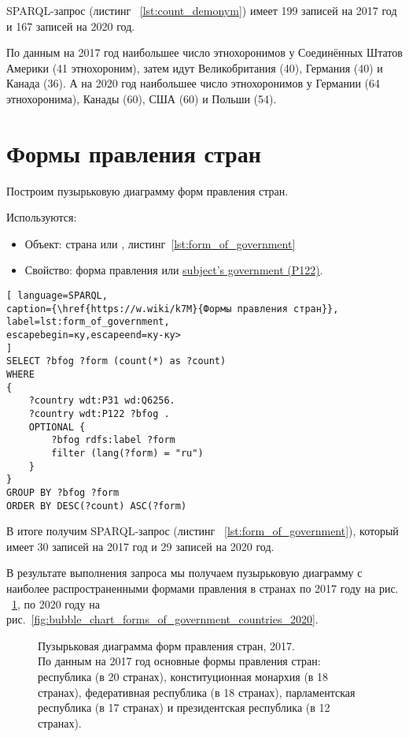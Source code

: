 SPARQL-запрос (листинг ~\ref{lst:count_demonym}) имеет 199 записей на 2017 год и 167 записей на 2020 год.

По данным на 2017 год наибольшее число этнохоронимов у Соединённых Штатов Америки (41 этнохороним), затем идут Великобритания (40), Германия (40) и Канада (36). А на 2020 год наибольшее число этнохоронимов у Германии (64 этнохоронима), Канады (60), США (60) и Польши (54).
\section{Формы правления стран}

Построим пузырьковую диаграмму форм правления стран.

Используются:
\begin{itemize}
	\item Объект: страна или , листинг~\ref{lst:form_of_government}
	\item Свойство: форма правления или \href{https://www.wikidata.org/wiki/Property:P122}{subject's government (P122)}.
\end{itemize}

\begin{lstlisting}[ language=SPARQL, 
caption={\href{https://w.wiki/k7M}{Формы правления стран}},
label=lst:form_of_government, 
escapebegin=ку,escapeend=ку-ку>
]
SELECT ?bfog ?form (count(*) as ?count)
WHERE 
{
	?country wdt:P31 wd:Q6256.
	?country wdt:P122 ?bfog .
	OPTIONAL {
		?bfog rdfs:label ?form
		filter (lang(?form) = "ru")
	}
}
GROUP BY ?bfog ?form
ORDER BY DESC(?count) ASC(?form)
\end{lstlisting}

В итоге получим SPARQL-запрос (листинг ~\ref{lst:form_of_government}), который имеет 30 записей на 2017 год и 29 записей на 2020 год.

В результате выполнения запроса мы получаем пузырьковую диаграмму с наиболее распространенными формами правления в странах по 2017 году на рис. ~\ref{fig:bubble_chart_forms_of_government_countries_2017}, по 2020 году на рис.~\ref{fig:bubble_chart_forms_of_government_countries_2020}.

\begin{figure}
	{
		\setlength{\fboxsep}{0pt}%
		\setlength{\fboxrule}{1pt}%
	}
	\caption{Пузырьковая диаграмма форм правления стран, 2017.
		\\			
		По данным на 2017 год основные формы правления стран: республика (в 20 странах), конституционная монархия (в 18 странах), федеративная республика (в 18 странах), парламентская республика (в 17 странах) и президентская республика (в 12 странах).}%
	\label{fig:bubble_chart_forms_of_government_countries_2017}%
\end{figure}

